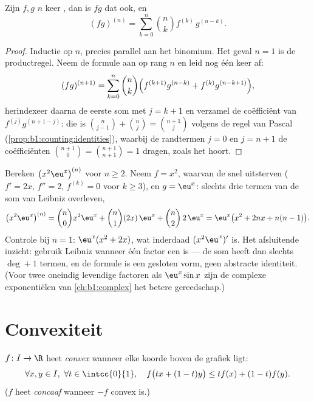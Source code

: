 \begin{theorem}\label{thm:b1:derivative:leibniz}
Zijn $f, g$ $n$ keer , dan is $fg$ dat
ook, en
\[
(fg)^{(n)} = \sum_{k=0}^{n} \binom nk f^{(k)}\, g^{(n-k)} .
\]
\end{theorem}

\begin{proof}
Inductie op $n$, precies parallel aan het binomium. Het geval $n
= 1$ is de productregel. Neem de formule aan op rang $n$ en leid
nog één keer af:
\[
(fg)^{(n+1)} = \sum_{k=0}^{n} \binom nk
\Bigl( f^{(k+1)} g^{(n-k)} + f^{(k)} g^{(n-k+1)} \Bigr),
\]
herindexeer daarna de eerste som met $j = k + 1$ en verzamel de
coëfficiënt van $f^{(j)} g^{(n+1-j)}$: die is $\binom{n}{j-1} +
\binom nj = \binom{n+1}{j}$ volgens de regel van Pascal
(\cref{prop:b1:counting:identities}), waarbij de randtermen $j =
0$ en $j = n + 1$ de coëfficiënten $\binom{n+1}{0} =
\binom{n+1}{n+1} = 1$ dragen, zoals het hoort.
\end{proof}

\begin{example}\label{ex:b1:derivative:leibnizaction}
Bereken $\bigl(x^2 \eu^x\bigr)^{(n)}$ voor $n \geq 2$. Neem $f =
x^2$, waarvan de  snel uitsterven ($f' = 2x$, $f'' =
2$, $f^{(k)} = 0$ voor $k \geq 3$), en $g = \eu^x$: slechts drie
termen van de som van Leibniz overleven,
\[
\bigl(x^2\eu^x\bigr)^{(n)}
= \binom n0 x^2 \eu^x + \binom n1 (2x)\,\eu^x + \binom n2\,
2\,\eu^x
= \eu^x\bigl(x^2 + 2nx + n(n-1)\bigr).
\]
Controle bij $n = 1$: $\eu^x(x^2 + 2x)$, wat inderdaad
$(x^2\eu^x)'$ is. Het afsluitende inzicht: gebruik Leibniz
wanneer één factor een  is --- de som heeft dan slechts
$\deg + 1$ termen, en de formule is een gesloten vorm, geen
abstracte identiteit. (Voor twee oneindig levendige factoren als
$\eu^x\sin x$ zijn de complexe exponentiëlen van
\cref{ch:b1:complex} het betere gereedschap.)
\end{example}

\section{Convexiteit}

\begin{definition}\label{def:b1:derivative:convex}
$f \colon I \to \R$ heet \emph{convex}
wanneer elke koorde boven de grafiek ligt:
\[
\forall x, y \in I,\ \forall t \in \intcc{0}{1}, \quad
f\bigl(tx + (1-t)y\bigr) \leq t f(x) + (1-t) f(y).
\]
($f$ heet \emph{concaaf} wanneer $-f$ convex is.)
\end{definition}


